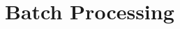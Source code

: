 \documentclass[oneside,11pt,dvipsnames]{book}
\numberwithin{equation}{section}
\theoremstyle{definition}
\theoremstyle{remark}
\newcommand{\tvn}[1]{\iftoggle{usecomment}{{\color{red}{[TVN]: #1}}}{}}
\newcommand{\ignore}[1]{}
\newcommand{\tool}{\texttt{NeuralSAT}}
\begin{document}











\section{Batch Processing} \label{sec:batchprocessing}
\end{document}
